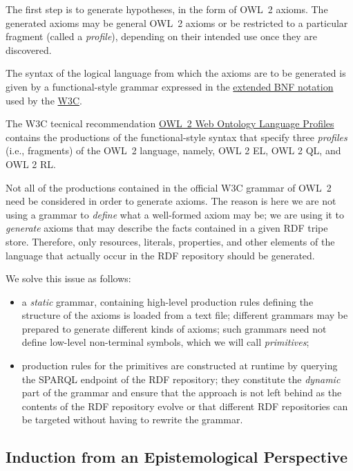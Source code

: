 \documentclass[a4paper]{article}
\newcounter{ex}
\begin{document}
The first step is to generate hypotheses, in the form of OWL~2 axioms.
The generated axioms may be general OWL~2 axioms or be restricted to a particular
fragment (called a \emph{profile}), depending on their intended use once they
are discovered.

The syntax of the logical language from which the axioms are to be
generated is given by a functional-style grammar expressed in the
\href{"http://www.w3.org/TR/2012/REC-owl2-syntax-20121211/#BNF_Notation}{extended BNF notation}
used by the \href{http://www.w3.org/}{W3C}.

The W3C tecnical recommendation \href{http://www.w3.org/TR/owl2-profiles}{OWL~2
Web Ontology Language Profiles} contains the productions of the functional-style syntax
that specify three \emph{profiles} (i.e., fragments) of the OWL~2 language,
namely, OWL 2 EL, OWL 2 QL, and OWL 2 RL.

Not all of the productions contained in the official W3C grammar of OWL~2 need be
considered in order to generate axioms. The reason is here we are not using a grammar
to \emph{define} what a well-formed axiom may be; we are using it to \emph{generate}
axioms that may describe the facts contained in a given RDF tripe store. Therefore,
only resources, literals, properties, and other elements of the language that actually
occur in the RDF repository should be generated.

We solve this issue as follows:
\begin{itemize}
\item a \emph{static} grammar, containing high-level production rules defining the
  structure of the axioms is loaded from a text file; different grammars may be
  prepared to generate different kinds of axioms; such grammars need not define
  low-level non-terminal symbols, which we will call \emph{primitives};
\item production rules for the primitives are constructed at runtime by querying
  the SPARQL endpoint of the RDF repository; they constitute the \emph{dynamic}
  part of the grammar and ensure that the approach is not left behind as the
  contents of the RDF repository evolve or that different RDF repositories can
  be targeted without having to rewrite the grammar.
\end{itemize}


\subsection{Induction from an Epistemological Perspective}
\label{epistemology}
\end{document}
